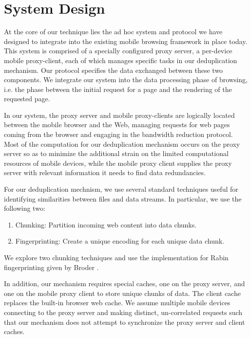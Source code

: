 \section{System Design}
\label{sec:sys_design}
At the core of our technique lies the ad hoc system and protocol we have designed to integrate into the existing mobile browsing framework in place today. This system is comprised of a specially configured proxy server, a per-device mobile proxy-client, each of which manages specific tasks in our deduplication mechanism. Our protocol specifies the data exchanged between these two components. We integrate our system into the data processing phase of browsing, i.e. the phase between the initial request for a page and the rendering of the requested page.

In our system, the proxy server and mobile proxy-clients are logically located between the mobile browser and the Web, managing requests for web pages coming from the browser and engaging in the bandwidth reduction protocol. Most of the computation for our deduplication mechanism occurs on the proxy server so as to minimize the additional strain on the limited computational resources of mobile devices, while the mobile proxy client supplies the proxy server with relevant information it needs to find data redundancies. 

For our deduplication mechnism, we use several standard techniques useful for identifying similarities between files and data streams. In particular, we use the following two: 
\begin{enumerate}
\item Chunking: Partition incoming web content into data chunks.
\item Fingerprinting: Create a unique encoding for each unique data chunk.
\end{enumerate}
We explore two chunking techniques and use the implementation for Rabin fingerprinting given by Broder \cite{broder}. 

In addition, our mechanism requires special caches, one on the proxy server, and one on the mobile proxy client to store unique chunks of data. The client cache replaces the built-in browser web cache. We assume multiple mobile devices connecting to the proxy server and making distinct, un-correlated requests such that our mechanism does not attempt to synchronize the proxy server and client caches.





